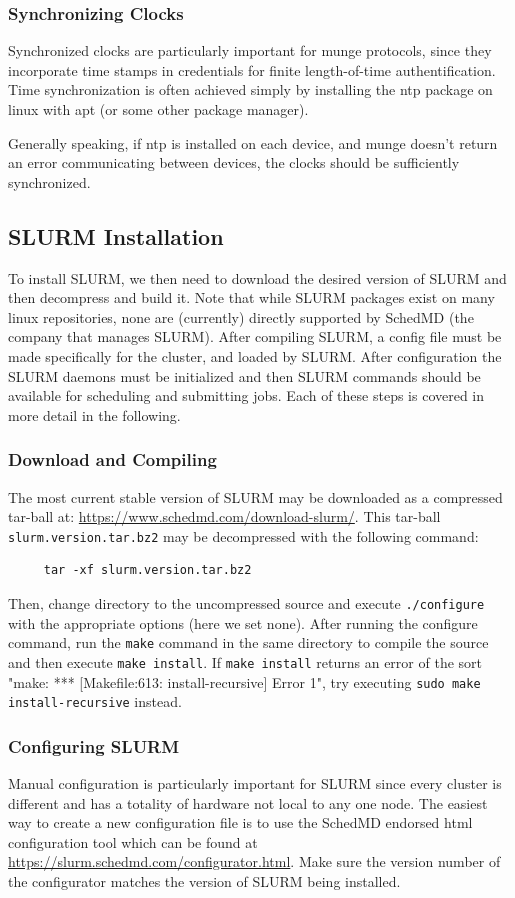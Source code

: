 \documentclass[]{article}
\begin{document}
\subsubsection{Synchronizing Clocks}
Synchronized clocks are particularly important for munge protocols, since they incorporate time stamps in credentials for finite length-of-time authentification.
Time synchronization is often achieved simply by installing the ntp package on linux with apt (or some other package manager).

Generally speaking, if ntp is installed on each device, and munge doesn't return an error communicating between devices, the clocks should be sufficiently synchronized.


\subsection{SLURM Installation}
To install SLURM, we then need to download the desired version of SLURM and then decompress and build it. Note that while SLURM packages exist on many linux repositories, none are (currently) directly supported by SchedMD (the company that manages SLURM). After compiling SLURM, a config file must be made specifically for the cluster, and loaded by SLURM. After configuration the SLURM daemons must be initialized and then SLURM commands should be available for scheduling and submitting jobs. Each of these steps is covered in more detail in the following.

\subsubsection{Download and Compiling} 
The most current stable version of SLURM may be downloaded as a compressed tar-ball at:
\url{https://www.schedmd.com/download-slurm/}.
This tar-ball \verb|slurm.version.tar.bz2| may be decompressed with the following command:
\begin{verbatim}
	 tar -xf slurm.version.tar.bz2
\end{verbatim}
Then, change directory to the uncompressed source and execute \verb|./configure| with the appropriate options (here we set none). After running the configure command, run the \verb|make| command in the same directory to compile the source and then execute \verb|make install|. If \verb|make install| returns an error of the sort "make: *** [Makefile:613: install-recursive] Error 1", try executing \verb|sudo make install-recursive| instead.

\subsubsection{Configuring SLURM}
Manual configuration is particularly important for SLURM since every cluster is different and has a totality of hardware not local to any one node. The easiest way to create a new configuration file is to use the SchedMD endorsed html configuration tool which can be found at \url{https://slurm.schedmd.com/configurator.html}. Make sure the version number of the configurator matches the version of SLURM being installed.
\end{document}
